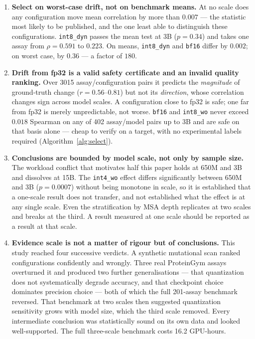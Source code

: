 \documentclass[11pt]{article}
\newcommand{\cfg}[1]{\texttt{#1}}
\begin{document}
\begin{enumerate}\setlength{\itemsep}{3pt}
  \item \textbf{Select on worst-case drift, not on benchmark means.} At no scale
        does any configuration move mean correlation by more than $0.007$ --- the
        statistic most likely to be published, and the one least able to
        distinguish these configurations. \cfg{int8\_dyn} passes the mean test at
        3B ($p = 0.34$) and takes one assay from $\rho = 0.591$ to $0.223$. On
        means, \cfg{int8\_dyn} and \cfg{bf16} differ by $0.002$; on worst case,
        by $0.36$ --- a factor of $180$.
  \item \textbf{Drift from fp32 is a valid safety certificate and an invalid
        quality ranking.} Over 3015 assay/configuration pairs it predicts the
        \emph{magnitude} of ground-truth change ($r = 0.56$--$0.81$) but not its
        \emph{direction}, whose correlation changes sign across model scales.
        A configuration close to fp32 is safe; one far from fp32 is merely
        unpredictable, not worse. \cfg{bf16} and \cfg{int8\_wo} never exceed
        $0.018$ Spearman on any of 402 assay/model pairs up to 3B and are safe on
        that basis alone --- cheap to verify on a target, with no experimental
        labels required (Algorithm~\ref{alg:select}).
  \item \textbf{Conclusions are bounded by model scale, not only by sample
        size.} The workload conflict that motivates half this paper holds at
        650M and 3B and dissolves at 15B. The \cfg{int4\_wo} effect differs
        significantly between 650M and 3B ($p = 0.0007$) without being monotone
        in scale, so it is established that a one-scale result does not
        transfer, and not established what the effect is at any single scale.
        Even the stratification by MSA depth replicates at two scales and breaks
        at the third. A result measured at one scale should be reported as a
        result at that scale.
  \item \textbf{Evidence scale is not a matter of rigour but of conclusions.}
        This study reached four successive verdicts. A synthetic mutational scan
        ranked configurations confidently and wrongly. Three real ProteinGym
        assays overturned it and produced two further generalisations --- that
        quantization does not systematically degrade accuracy, and that
        checkpoint choice dominates precision choice --- both of which the full
        201-assay benchmark reversed. That benchmark at two scales then
        suggested quantization sensitivity grows with model size, which the
        third scale removed. Every intermediate conclusion was statistically
        sound on its own data and looked well-supported. The full three-scale
        benchmark costs 16.2 GPU-hours.
\end{enumerate}
\end{document}
